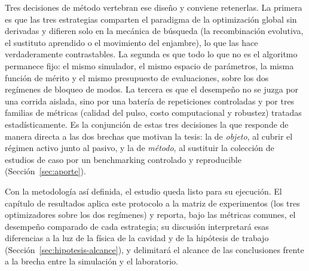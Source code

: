 Tres decisiones de método vertebran ese diseño y conviene retenerlas. La primera es
que las tres estrategias comparten el paradigma de la optimización global sin
derivadas y difieren solo en la mecánica de búsqueda (la recombinación evolutiva, el
sustituto aprendido o el movimiento del enjambre), lo que las hace verdaderamente
contrastables. La segunda es que todo lo que no es el algoritmo permanece fijo: el
mismo simulador, el mismo espacio de parámetros, la misma función de mérito y el
mismo presupuesto de evaluaciones, sobre los dos regímenes de bloqueo de modos. La
tercera es que el desempeño no se juzga por una corrida aislada, sino por una batería
de repeticiones controladas y por tres familias de métricas (calidad del pulso, costo
computacional y robustez) tratadas estadísticamente. Es la conjunción de estas tres
decisiones la que responde de manera directa a las dos brechas que motivan la tesis:
la de \emph{objeto}, al cubrir el régimen activo junto al pasivo, y la de
\emph{método}, al sustituir la colección de estudios de caso por un benchmarking
controlado y reproducible (Sección~\ref{sec:aporte}).

Con la metodología así definida, el estudio queda listo para su ejecución. El
capítulo de resultados aplica este protocolo a la matriz de experimentos (los tres
optimizadores sobre los dos regímenes) y reporta, bajo las métricas comunes, el
desempeño comparado de cada estrategia; su discusión interpretará esas diferencias a
la luz de la física de la cavidad y de la hipótesis de trabajo
(Sección~\ref{sec:hipotesis-alcance}), y delimitará el alcance de las conclusiones
frente a la brecha entre la simulación y el laboratorio.
